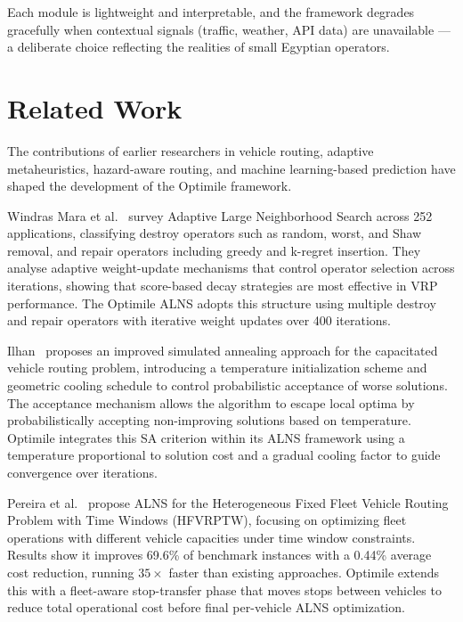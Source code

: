 \documentclass[conference]{IEEEtran}
\begin{document}
Each module is lightweight and interpretable, and the framework degrades
gracefully when contextual signals (traffic, weather, API data) are unavailable
— a deliberate choice reflecting the realities of small Egyptian operators.

\section{\textbf{\large Related Work}}
\label{sec:related}

The contributions of earlier researchers in vehicle routing, adaptive
metaheuristics, hazard-aware routing, and machine learning-based prediction
have shaped the development of the Optimile framework.

Windras Mara et al.~\citep{mara_survey_2022} survey Adaptive Large
Neighborhood Search across 252 applications, classifying destroy operators
such as random, worst, and Shaw removal, and repair operators including
greedy and k-regret insertion. They analyse adaptive weight-update mechanisms
that control operator selection across iterations, showing that score-based
decay strategies are most effective in VRP performance. The Optimile ALNS
adopts this structure using multiple destroy and repair operators with
iterative weight updates over 400 iterations.

Ilhan~\citep{ilhan_improved_2021} proposes an improved simulated annealing
approach for the capacitated vehicle routing problem, introducing a temperature
initialization scheme and geometric cooling schedule to control probabilistic
acceptance of worse solutions. The acceptance mechanism allows the algorithm
to escape local optima by probabilistically accepting non-improving solutions
based on temperature. Optimile integrates this SA criterion within its ALNS
framework using a temperature proportional to solution cost and a gradual
cooling factor to guide convergence over iterations.

Pereira et al.~\citep{pereira_approach_2024} propose ALNS for the
Heterogeneous Fixed Fleet Vehicle Routing Problem with Time Windows
(HFVRPTW), focusing on optimizing fleet operations with different vehicle
capacities under time window constraints. Results show it improves 69.6\% of
benchmark instances with a 0.44\% average cost reduction, running $35\times$
faster than existing approaches. Optimile extends this with a fleet-aware
stop-transfer phase that moves stops between vehicles to reduce total
operational cost before final per-vehicle ALNS optimization.
\end{document}
